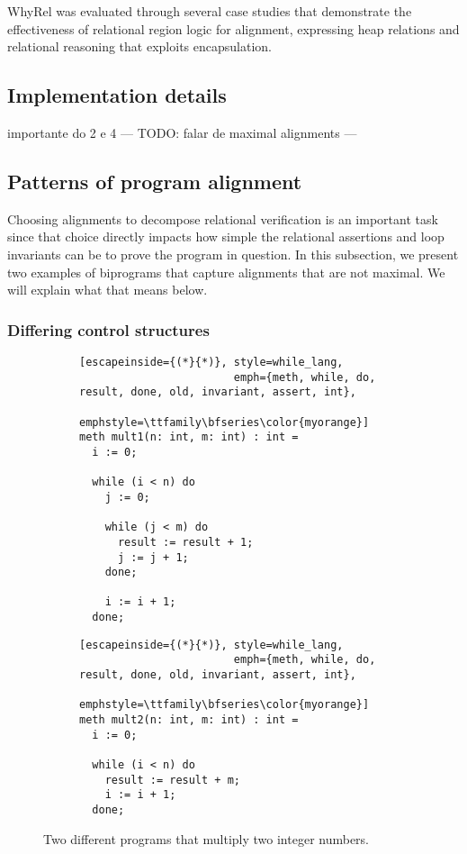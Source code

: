 WhyRel was evaluated through several case studies that demonstrate the effectiveness of relational region logic for alignment, expressing heap relations and relational reasoning that exploits encapsulation.


\subsection{Implementation details}
\label{subsec:whyrel_specifying}
importante do 2 e 4
--- TODO: falar de maximal alignments ---



\subsection{Patterns of program alignment}
\label{subsec:whyrel_patterns}

Choosing alignments to decompose relational verification is an important task since that choice directly impacts how simple the relational assertions and loop invariants can be to prove the program in question.
In this subsection, we present two examples of biprograms that capture alignments that are not maximal.
We will explain what that means below.


\subsubsection{Differing control structures}
\label{subsubsec:diff_control_structs}

\begin{figure}[h]
  \centering

  \begin{subfigure}[t]{0.49\textwidth}
    \centering
    \noindent
    \begin{lstlisting}[escapeinside={(*}{*)}, style=while_lang,
                        emph={meth, while, do, result, done, old, invariant, assert, int},
                        emphstyle=\ttfamily\bfseries\color{myorange}]
meth mult1(n: int, m: int) : int =
  i := 0;

  while (i < n) do
    j := 0;

    while (j < m) do
      result := result + 1;
      j := j + 1;
    done;

    i := i + 1;
  done;
    \end{lstlisting}
  \end{subfigure}
  \hfill
  \begin{subfigure}[t]{0.49\textwidth}
    \centering
    \noindent
    \begin{lstlisting}[escapeinside={(*}{*)}, style=while_lang,
                        emph={meth, while, do, result, done, old, invariant, assert, int},
                        emphstyle=\ttfamily\bfseries\color{myorange}]
meth mult2(n: int, m: int) : int =
  i := 0;

  while (i < n) do
    result := result + m;
    i := i + 1;
  done;
    \end{lstlisting}
  \end{subfigure}

  \caption{Two different programs that multiply two integer numbers.}
  \label{fig:mult_source_programs}
\end{figure}

